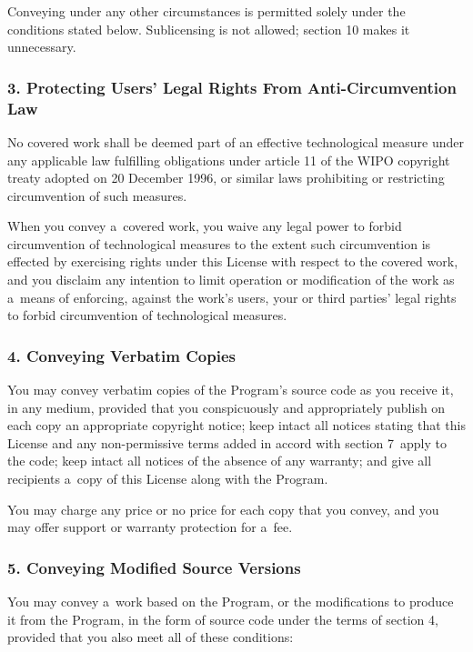 \documentclass[a4paper, 11pt, twoside]{article}
\begin{document}
Conveying under any other circumstances is permitted solely under the conditions stated below. Sublicensing is not allowed; section 10 makes it unnecessary.

\subsubsection{3. Protecting Users' Legal Rights From Anti-Circumvention Law}

No covered work shall be deemed part of an effective technological measure under any applicable law fulfilling obligations under article 11 of the WIPO copyright treaty adopted on 20 December 1996, or similar laws prohibiting or restricting circumvention of such measures.

When you convey a~covered work, you waive any legal power to forbid circumvention of technological measures to the extent such circumvention is effected by exercising rights under this License with respect to the covered work, and you disclaim any intention to limit operation or modification of the work as a~means of enforcing, against the work's users, your or third parties' legal rights to forbid circumvention of technological measures.

\subsubsection{4. Conveying Verbatim Copies}

You may convey verbatim copies of the Program's source code as you receive it, in any medium, provided that you conspicuously and appropriately publish on each copy an appropriate copyright notice; keep intact all notices stating that this License and any non-permissive terms added in accord with section 7~apply to the code; keep intact all notices of the absence of any warranty; and give all recipients a~copy of this License along with the Program.

You may charge any price or no price for each copy that you convey, and you may offer support or warranty protection for a~fee.

\subsubsection{5. Conveying Modified Source Versions}

You may convey a~work based on the Program, or the modifications to produce it from the Program, in the form of source code under the terms of section 4, provided that you also meet all of these conditions:
\end{document}
